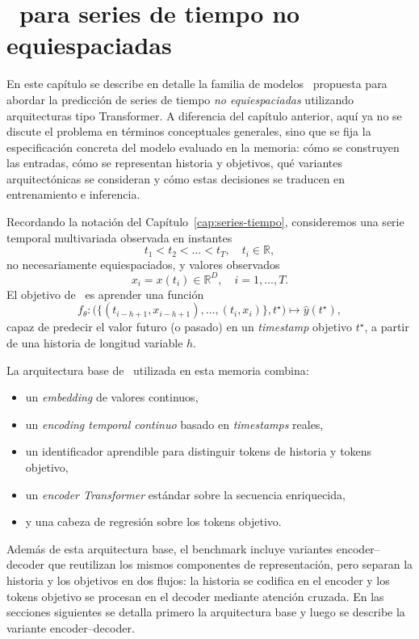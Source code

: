 \chapter{\CTTransformer\ para series de tiempo no equiespaciadas}
\label{cap:modelo-no-equiespaciado}

En este capítulo se describe en detalle la familia de modelos \CTTransformerFull\ propuesta para abordar la predicción de series de tiempo \emph{no equiespaciadas} utilizando arquitecturas tipo Transformer. A diferencia del capítulo anterior, aquí ya no se discute el problema en términos conceptuales generales, sino que se fija la especificación concreta del modelo evaluado en la memoria: cómo se construyen las entradas, cómo se representan historia y objetivos, qué variantes arquitectónicas se consideran y cómo estas decisiones se traducen en entrenamiento e inferencia.

\hfill

Recordando la notación del Capítulo~\ref{cap:series-tiempo}, consideremos una serie temporal multivariada observada en instantes
\[
    t_1 < t_2 < \dots < t_T, \quad t_i \in \mathbb{R},
\]
no necesariamente equiespaciados, y valores observados
\[
    x_i = x(t_i) \in \mathbb{R}^{D}, \quad i = 1,\dots,T.
\]
El objetivo de \CTTransformer\ es aprender una función
\[
    f_\theta: \bigl(\{(t_{i-h+1}, x_{i-h+1}), \dots, (t_i, x_i)\}, t^\star\bigr) \mapsto \hat{y}(t^\star),
\]
capaz de predecir el valor futuro (o pasado) en un \emph{timestamp} objetivo $t^\star$, a partir de una historia de longitud variable $h$.

\hfill

La arquitectura base de \CTTransformer\ utilizada en esta memoria combina:
\begin{itemize}
    \item un \emph{embedding} de valores continuos,
    \item un \emph{encoding temporal continuo} basado en \emph{timestamps} reales,
    \item un identificador aprendible para distinguir tokens de historia y tokens objetivo,
    \item un \emph{encoder Transformer} estándar sobre la secuencia enriquecida,
    \item y una cabeza de regresión sobre los tokens objetivo.
\end{itemize}

Además de esta arquitectura base, el benchmark incluye variantes encoder--decoder que reutilizan los mismos componentes de representación, pero separan la historia y los objetivos en dos flujos: la historia se codifica en el encoder y los tokens objetivo se procesan en el decoder mediante atención cruzada. En las secciones siguientes se detalla primero la arquitectura base y luego se describe la variante encoder--decoder.

